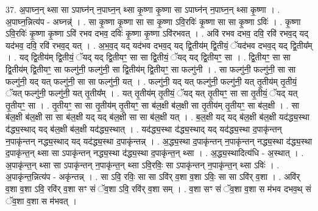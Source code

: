 \documentclass[17pt]{extarticle}
\begin{document}
37. अ॒पाघ्न॒न् थ्सा सा ऽपाघ्न॑न् न॒पाघ्न॒न् थ्सा कृ॒ष्णा कृ॒ष्णा सा ऽपाघ्न॑न् न॒पाघ्न॒न् थ्सा कृ॒ष्णा । . अ॒पाघ्न॒न्नित्य॑प - अघ्नन्न्॑ । . सा कृ॒ष्णा कृ॒ष्णा सा सा कृ॒ष्णा ऽवि॒रविः॑ कृ॒ष्णा सा सा कृ॒ष्णा ऽविः॑ । . कृ॒ष्णा ऽवि॒रविः॑ कृ॒ष्णा कृ॒ष्णा ऽवि॑ रभव दभव॒ दविः॑ कृ॒ष्णा कृ॒ष्णा ऽवि॑रभवत् । . अवि॑ रभव दभव॒ दवि॒ रवि॑ रभव॒द् यद् यद॑भव॒ दवि॒ रवि॑ रभव॒द् यत् । . अ॒भ॒व॒द् यद् यद॑भव दभव॒द् यद् द्वि॒तीय॑म् द्वि॒तीयं॒ ॅयद॑भव दभव॒द् यद् द्वि॒तीय᳚म् । . यद् द्वि॒तीय॑म् द्वि॒तीयं॒ ॅयद् यद् द्वि॒तीयꣳ॒॒ सा सा द्वि॒तीयं॒ ॅयद् यद् द्वि॒तीयꣳ॒॒ सा । . द्वि॒तीयꣳ॒॒ सा सा द्वि॒तीय॑म् द्वि॒तीयꣳ॒॒ सा फल्गु॑नी॒ फल्गु॑नी॒ सा द्वि॒तीय॑म् द्वि॒तीयꣳ॒॒ सा फल्गु॑नी । . सा फल्गु॑नी॒ फल्गु॑नी॒ सा सा फल्गु॑नी॒ यद् यत् फल्गु॑नी॒ सा सा फल्गु॑नी॒ यत् । . फल्गु॑नी॒ यद् यत् फल्गु॑नी॒ फल्गु॑नी॒ यत् तृ॒तीय॑म् तृ॒तीयं॒ ॅयत् फल्गु॑नी॒ फल्गु॑नी॒ यत् तृ॒तीय᳚म् । . यत् तृ॒तीय॑म् तृ॒तीयं॒ ॅयद् यत् तृ॒तीयꣳ॒॒ सा सा तृ॒तीयं॒ ॅयद् यत् तृ॒तीयꣳ॒॒ सा । . तृ॒तीयꣳ॒॒ सा सा तृ॒तीय॑म् तृ॒तीयꣳ॒॒ सा ब॑ल॒क्षी ब॑ल॒क्षी सा तृ॒तीय॑म् तृ॒तीयꣳ॒॒ सा ब॑ल॒क्षी । . सा ब॑ल॒क्षी ब॑ल॒क्षी सा सा ब॑ल॒क्षी यद् यद् ब॑ल॒क्षी सा सा ब॑ल॒क्षी यत् । . ब॒ल॒क्षी यद् यद् ब॑ल॒क्षी ब॑ल॒क्षी यद॑द्ध्य॒स्था द॑द्ध्य॒स्थाद् यद् ब॑ल॒क्षी ब॑ल॒क्षी यद॑द्ध्य॒स्थात् । . यद॑द्ध्य॒स्था द॑द्ध्य॒स्थाद् यद् यद॑द्ध्य॒स्था द॒पाकृ॑न्तन् न॒पाकृ॑न्तन् नद्ध्य॒स्थाद् यद् यद॑द्ध्य॒स्था द॒पाकृ॑न्तन्न् । . अ॒द्ध्य॒स्था द॒पाकृ॑न्तन् न॒पाकृ॑न्तन् नद्ध्य॒स्था द॑द्ध्य॒स्था द॒पाकृ॑न्त॒न् थ्सा सा ऽपाकृ॑न्तन् नद्ध्य॒स्था द॑द्ध्य॒स्था द॒पाकृ॑न्त॒न् थ्सा । . अ॒द्ध्य॒स्थादित्य॑धि - अ॒स्थात् । . अ॒पाकृ॑न्त॒न् थ्सा सा ऽपाकृ॑न्तन् न॒पाकृ॑न्त॒न् थ्सा ऽवि॒रविः॒ सा ऽपाकृ॑न्तन् न॒पाकृ॑न्त॒न् थ्सा ऽविः॑ । . अ॒पाकृ॑न्त॒न्नित्य॑प - अकृ॑न्तन्न् । . सा ऽवि॒ रविः॒ सा सा ऽवि॑र् व॒शा व॒शा ऽविः॒ सा सा ऽवि॑र् व॒शा । . अवि॑र् व॒शा व॒शा ऽवि॒ रवि॑र् व॒शा सꣳ सं ॅव॒शा ऽवि॒ रवि॑र् व॒शा सम् । . व॒शा सꣳ सं ॅव॒शा व॒शा स म॑भव दभव॒थ् सं ॅव॒शा व॒शा स म॑भवत् । \newline
\pagebreak
{}
\end{document}
